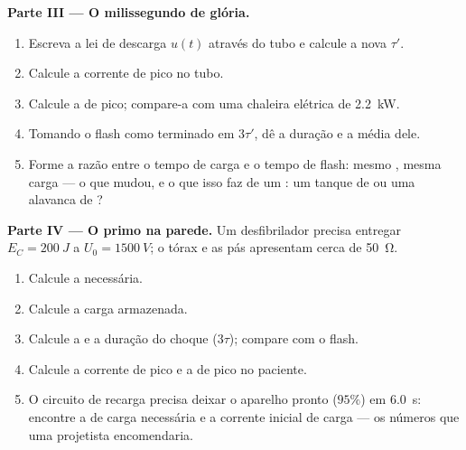 \begin{problem}
\medskip
\noindent\textbf{Parte III --- O milissegundo de glória.}
\begin{enumerate}[resume]
  \item Escreva a lei de descarga $u(t)$ através do tubo e calcule a nova  $\tau'$.
  \item Calcule a corrente de pico no tubo.
  \item Calcule a  de pico; compare-a com uma chaleira elétrica de
        \qty{2.2}{kW}.
  \item Tomando o flash como terminado em $3\tau'$, dê a duração e a  média
        dele.
  \item Forme a razão entre o tempo de carga e o tempo de flash: mesmo , mesma
        carga --- o que mudou, e o que isso faz de um : um tanque de 
        ou uma alavanca de ?
\end{enumerate}

\medskip
\noindent\textbf{Parte IV --- O primo na parede.}
Um desfibrilador precisa entregar $E_C = \qty{200}{J}$ a $U_0 = \qty{1500}{V}$; o tórax
e as pás apresentam cerca de \qty{50}{\ohm}.
\begin{enumerate}[resume]
  \item Calcule a  necessária.
  \item Calcule a carga armazenada.
  \item Calcule a  e a duração do choque ($3\tau$); compare com o
        flash.
  \item Calcule a corrente de pico e a  de pico no paciente.
  \item O circuito de recarga precisa deixar o aparelho pronto ($95\%$) em
        \qty{6.0}{s}: encontre a  de carga necessária e a corrente inicial de
        carga --- os números que uma projetista encomendaria.
\end{enumerate}
\end{problem}
